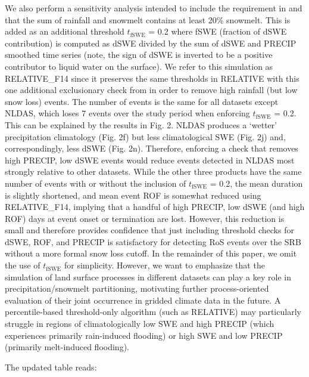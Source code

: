 \documentclass{article}
\begin{document}
{{\color{Orange}
We also perform a sensitivity analysis intended to include the requirement in \citet{freudiger2014large} and \citet{musselman2018projected} that the sum of rainfall and snowmelt contains at least 20\% snowmelt.
This is added as an additional threshold $t_{\textrm{fSWE}}$ = 0.2 where fSWE (fraction of dSWE contribution) is computed as dSWE divided by the sum of dSWE and PRECIP smoothed time series (note, the sign of dSWE is inverted to be a positive contributor to liquid water on the surface).
We refer to this simulation as RELATIVE\_F14 since it preserves the same thresholds in RELATIVE with this one additional exclusionary check from \citet{freudiger2014large} in order to remove high rainfall (but low snow loss) events.
The number of events is the same for all datasets except NLDAS, which loses 7 events over the study period when enforcing $t_{\textrm{fSWE}}$ = 0.2.
This can be explained by the results in Fig. 2. NLDAS produces a `wetter' precipitation climatology (Fig. 2f) but less climatological SWE (Fig. 2j) and, correspondingly, less dSWE (Fig. 2n).
Therefore, enforcing a check that removes high PRECIP, low dSWE events would reduce events detected in NLDAS most strongly relative to other datasets.
While the other three products have the same number of events with or without the inclusion of $t_{\textrm{fSWE}}$ = 0.2, the mean duration is slightly shortened, and mean event ROF is somewhat reduced using RELATIVE\_F14, implying that a handful of high PRECIP, low dSWE (and high ROF) days at event onset or termination are lost.
However, this reduction is small and therefore provides confidence that just including threshold checks for dSWE, ROF, and PRECIP is satisfactory for detecting RoS events over the SRB without a more formal snow loss cutoff.
In the remainder of this paper, we omit the use of $t_{\textrm{fSWE}}$ for simplicity.
However, we want to emphasize that the simulation of land surface processes in different datasets can play a key role in precipitation/snowmelt partitioning, motivating further process-oriented evaluation of their joint occurrence in gridded climate data in the future.
A percentile-based threshold-only algorithm (such as RELATIVE) may particularly struggle in regions of climatologically low SWE and high PRECIP (which experiences primarily rain-induced flooding) or high SWE and low PRECIP (primarily melt-induced flooding).
}

\clearpage

The updated table reads:

}
\end{document}
